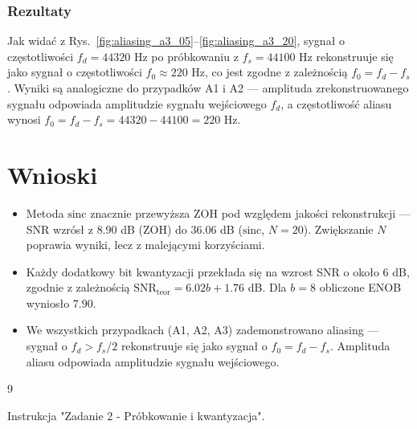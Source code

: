\documentclass[12pt]{article}
\begin{document}
\subsubsection{Rezultaty}

Jak widać z Rys.~\ref{fig:aliasing_a3_05}--\ref{fig:aliasing_a3_20},
sygnał o częstotliwości $f_d = 44320$ Hz po próbkowaniu z $f_s = 44100$ Hz
rekonstruuje się jako sygnał o częstotliwości $f_0 \approx 220$ Hz,
co jest zgodne z zależnością $f_0 = f_d - f_s$.
Wyniki są analogiczne do przypadków A1 i A2 ---
amplituda zrekonstruowanego sygnału odpowiada amplitudzie sygnału wejściowego $f_d$,
a częstotliwość aliasu wynosi $f_0 = f_d - f_s = 44320 - 44100 = 220$ Hz.

\section{Wnioski}

\begin{itemize}
    \item Metoda $\text{sinc}$ znacznie przewyższa ZOH pod względem jakości rekonstrukcji
    --- SNR wzrósł z $8.90$ dB (ZOH) do $36.06$ dB ($\text{sinc}$, $N=20$).
    Zwiększanie $N$ poprawia wyniki, lecz z malejącymi korzyściami.

    \item Każdy dodatkowy bit kwantyzacji przekłada się na wzrost SNR o około $6$ dB,
    zgodnie z zależnością $\text{SNR}_\text{teor} = 6.02b + 1.76$ dB.
    Dla $b=8$ obliczone ENOB wyniosło $7.90$.

    \item We wszystkich przypadkach (A1, A2, A3) zademonstrowano aliasing ---
    sygnał o $f_d > f_s/2$ rekonstruuje się jako sygnał o $f_0 = f_d - f_s$.
    Amplituda aliasu odpowiada amplitudzie sygnału wejściowego.
\end{itemize}

\begin{thebibliography}{9}

 Instrukcja "Zadanie 2 - Próbkowanie i kwantyzacja".

\end{thebibliography}
\end{document}
